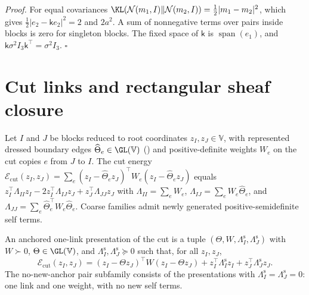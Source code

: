 \noindent\emph{Proof.}
For equal covariances $\KL(\mathcal N(m_1,I)\Vert\mathcal N(m_2,I))=\tfrac12\lvert m_1-m_2\rvert^2$, which
gives $\tfrac12\lvert e_2-\mathsf ke_2\rvert^2=2$ and $2a^2$. A sum of nonnegative terms over pairs inside
blocks is zero for singleton blocks. The fixed space of $\mathsf k$ is $\operatorname{span}(e_1)$, and
$\mathsf k\sigma^2I_3\mathsf k^\top=\sigma^2I_3$. $\square$

\section{Cut links and rectangular sheaf closure}
\label{sec:cg-sheaf-closure}

Let $I$ and $J$ be blocks reduced to root coordinates $z_I,z_J\in \mathbb V$, with represented dressed boundary
edges $\widehat\Theta_e\in\GL(\mathbb V)$ () and positive-definite weights $W_e$ on
the cut copies $e$ from $J$ to $I$. The cut energy
$\mathcal E_{\mathrm{cut}}(z_I,z_J)=\sum_e(z_I-\widehat\Theta_ez_J)^\top W_e(z_I-\widehat\Theta_ez_J)$
equals $z_I^\top\Lambda_{II}z_I-2z_I^\top\Lambda_{IJ}z_J+z_J^\top\Lambda_{JJ}z_J$ with
$\Lambda_{II}=\sum_eW_e$, $\Lambda_{IJ}=\sum_eW_e\widehat\Theta_e$, and
$\Lambda_{JJ}=\sum_e\widehat\Theta_e^\top W_e\widehat\Theta_e$. Coarse families admit newly generated
positive-semidefinite self terms.

An anchored one-link presentation of the cut is a tuple $(\Theta,W,\Lambda^{\mathrm s}_I,\Lambda^{\mathrm s}_J)$
with $W\succ0$, $\Theta\in\GL(\mathbb V)$, and $\Lambda^{\mathrm s}_I,\Lambda^{\mathrm s}_J\succeq0$ such that, for all
$z_I,z_J$,
\begin{equation}
\mathcal E_{\mathrm{cut}}(z_I,z_J)=(z_I-\Theta z_J)^\top W(z_I-\Theta z_J)
+z_I^\top\Lambda^{\mathrm s}_Iz_I+z_J^\top\Lambda^{\mathrm s}_Jz_J.
\label{eq:cg-cut-anchored-link}
\end{equation}
The no-new-anchor pair subfamily consists of the presentations with
$\Lambda^{\mathrm s}_I=\Lambda^{\mathrm s}_J=0$: one link and one weight, with no new self terms.


